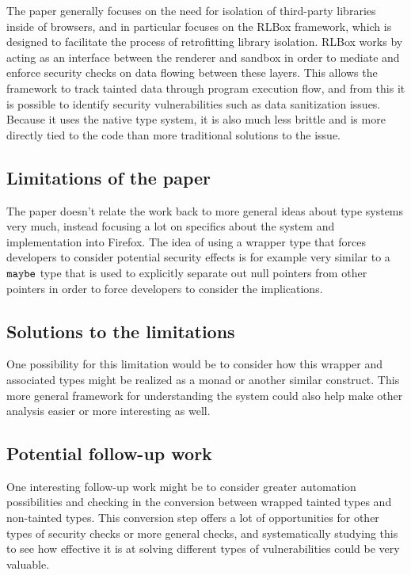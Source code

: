 \documentclass[11pt]{article}
\begin{document}
The paper generally focuses on the need for isolation of third-party libraries inside of browsers, and in particular focuses on the RLBox framework, which is designed to facilitate the process of retrofitting library isolation.
RLBox works by acting as an interface between the renderer and sandbox in order to mediate and enforce security checks on data flowing between these layers.
This allows the framework to track tainted data through program execution flow, and from this it is possible to identify security vulnerabilities such as data sanitization issues.
Because it uses the native type system, it is also much less brittle and is more directly tied to the code than more traditional solutions to the issue.

\subsection*{Limitations of the paper}

The paper doesn't relate the work back to more general ideas about type systems very much, instead focusing a lot on specifics about the system and implementation into Firefox.
The idea of using a wrapper type that forces developers to consider potential security effects is for example very similar to a $\verb|maybe|$ type that is used to explicitly separate out null pointers from other pointers in order to force developers to consider the implications.

\subsection*{Solutions to the limitations}

One possibility for this limitation would be to consider how this wrapper and associated types might be realized as a monad or another similar construct.
This more general framework for understanding the system could also help make other analysis easier or more interesting as well.

\subsection*{Potential follow-up work}

One interesting follow-up work might be to consider greater automation possibilities and checking in the conversion between wrapped tainted types and non-tainted types.
This conversion step offers a lot of opportunities for other types of security checks or more general checks, and systematically studying this to see how effective it is at solving different types of vulnerabilities could be very valuable.
\end{document}
